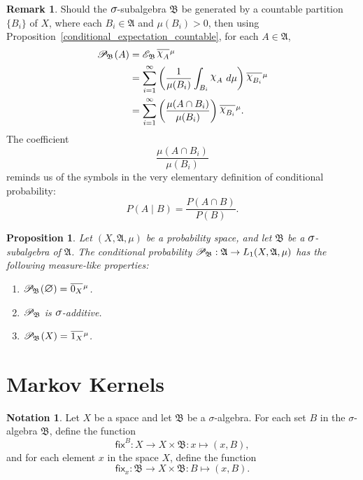 \documentclass[
twoside=true,
paper=letter,
fontsize=9pt,
pagesize=auto,
leqno,
openany,
headsepline,
overfullrule,
]{scrbook}
\theoremstyle{plain}
\theoremstyle{plain}
\newtheorem{prop}[thm]{Proposition}
\theoremstyle{definition}
\newtheorem{rmk}[thm]{Remark}
\newtheorem{notn}[thm]{Notation}
\theoremstyle{bfnoteitalic}
\theoremstyle{bfnoteroman}
\newcommand{\sigalg}[1]{\mathfrak{#1}}
\newcommand{\cali}[1]{\mathscr{#1}}
\newcommand{\sfop}[1]{\mathsf{#1}}
\newcommand{\condexpsub}[2]
{\mathop{\cali{E}\hspace{-1.5pt}}\nolimits_{#2}\hspace{-1pt}#1}
\newcommand{\condprobsub}[2]
{\mathop{\cali{P}\hspace{-1.5pt}}\nolimits_{#2}\hspace{-1pt}\left(#1\right)}
\newcommand{\condprobop}[1]{\mathop{\cali{P}\hspace{-1pt}}\nolimits_{#1}}
\newcommand{\textsigma}{\hbox{\large{$\sigma$}}\kern-1pt}
\newcommand{\charfunction}[1]{\mathop{{\raisebox{2pt}{$\chi$}}_{#1}}}
\newcommand{\mtset}{\hbox{\large{$\varnothing$}}}
\newcommand{\meets}{\cap}
\newcommand{\sigmaalgebra}{\sigalg{A}}
\newcommand{\sigmaalgebraii}{\sigalg{B}}
\newcommand{\Lone}{L_1(\measurespace, \sigmaalgebra, \measure)}
\newcommand{\sigalgb}{\sigmaalgebraii}
\newcommand{\measurespace}{X}
\newcommand{\mspaceelt}{x}
\newcommand{\measure}{\mu}
\newcommand{\seti}{A}
\newcommand{\setii}{B}
\newcommand{\fixinthefirst}[1]{\sfop{fix}_{#1}}
\newcommand{\fixinthesecond}[1]{\sfop{fix}^{#1}}
\newcommand*\xbar[1]{%
   \hbox{%
     \vbox{%
       \hrule height 0.4pt %
       \kern0.4ex%
       \hbox{%
         \ensuremath{#1}%
       }%
     }%
   }%
}
\newcommand{\lebclass}[1]{\hspace{.5pt}\xbar{#1}\hspace{0.5pt}}
\newcommand{\ellclass}[2]{\lebclass{#1}^{#2}}
\begin{document}
\begin{rmk}
Should the $\textsigma$-subalgebra $\sigmaalgebraii$ be generated by a countable partition $\{\setii_i\}$ of $\measurespace$, where each $\setii_i\in\sigmaalgebra$ and $\measure(\setii_i)>0$, then using Proposition~\ref{conditional_expectation_countable}, for each 
$\seti\in\sigmaalgebra$,
\begin{align*}
\condprobsub{\seti}{\sigalgb}
& = \condexpsub{\ellclass{\charfunction{\seti}}{\measure}}{\sigmaalgebraii} \\
& =
\sum_{i=1}^{\infty}
\left(
\frac{1}{\measure(\setii_i)}
\int_{\setii_i} \charfunction{\seti}\, d\measure
\right)
\ellclass{\charfunction{\setii_i}}{\measure} \\
& = 
\sum_{i=1}^{\infty}
\left(
\frac{\measure(\seti \meets \setii_i)}{\measure(\setii_i)}
\right)
\ellclass{\charfunction{\setii_i}}{\measure}.
\end{align*}
The coefficient
\[
\dfrac{\measure(\seti \meets \setii_i)}{\measure(\setii_i)}
\]
reminds us of the symbols in the very elementary definition of conditional probability:
\[
P(A\mid B) = \frac{P(A\meets B)}{P(B)}.
\]
\end{rmk}



\begin{prop}
Let
$(\measurespace,\sigmaalgebra,\measure)$
be a probability space, and let $\sigmaalgebraii$ be a $\textsigma$-subalgebra of $\sigmaalgebra$.
The conditional probability $\condprobop{\sigmaalgebraii}: \sigmaalgebra \to \Lone$  
has the following measure-like properties:
\begin{enumerate}
\item 
$\condprobsub{\mtset}{\sigmaalgebraii} = \ellclass{0_\measurespace}{\measure}$.
\item
$\condprobop{\sigmaalgebraii}$ is $\textsigma$-additive.
\item
$\condprobsub{\measurespace}{\sigmaalgebraii} = \ellclass{1_\measurespace}{\measure}$.
\end{enumerate}
\end{prop}




\section{Markov Kernels}
\begin{notn}
Let 
$\measurespace$ be a space and let
$\sigmaalgebraii$ be a \textsigma-algebra.
For each set $\setii$ in the \textsigma-algebra $\sigmaalgebraii$, define the function
\[
\fixinthesecond{\setii}
: \measurespace\to\measurespace\times\sigmaalgebraii
: \mspaceelt\mapsto(\mspaceelt,\setii),
\]
 and for each  element $\mspaceelt$ in the space $\measurespace$, define the function
\[
\fixinthefirst{\mspaceelt}
: \sigmaalgebraii\to\measurespace\times\sigmaalgebraii
: \setii\mapsto(\mspaceelt,\setii).
\]
\end{notn}
\end{document}
